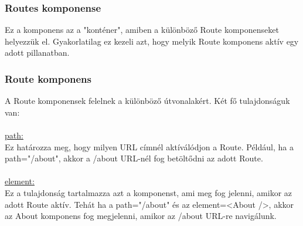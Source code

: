 \subsubsection*{Routes komponense}
Ez a komponens az a "konténer", amiben a különböző Route komponenseket helyezzük el. Gyakorlatilag ez kezeli azt, hogy melyik Route komponens aktív egy adott pillanatban.
\subsubsection*{Route komponens}
A Route komponensek felelnek a különböző útvonalakért. Két fő tulajdonságuk van:
\\
\\
\underline{path:}
\\
Ez határozza meg, hogy milyen URL címnél aktíválódjon a Route. Például, ha a path="/about", akkor a /about URL-nél fog betöltődni az adott Route.
\\
\\
\underline{element:}
\\
Ez a tulajdonság tartalmazza azt a komponenst, ami meg fog jelenni, amikor az adott Route aktív. Tehát ha a path="/about" és az element={<About />}, akkor az About komponens fog megjelenni, amikor az /about URL-re navigálunk.
